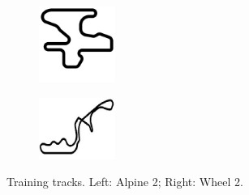\documentclass[10pt,journal,compsoc]{IEEEtran}
\begin{document}
%
\begin{figure}[!ht]	
\centering
\begin{subfigure}[b]{0.15\textwidth}
	\centering
	\includegraphics[width=2.5cm]{fig/alpine2.jpg}
	\label{fig:alpine2}
\end{subfigure}
\hfill
\begin{subfigure}[b]{0.15\textwidth}
	\centering
	\includegraphics[width=2.5cm]{fig/wheel2.jpg}
	\label{fig:wheel2}
\end{subfigure}
\caption{Training tracks. Left: Alpine 2; Right: Wheel 2.}
\label{fig:alpine2_wheel2track}
\end{figure}
\end{document}
